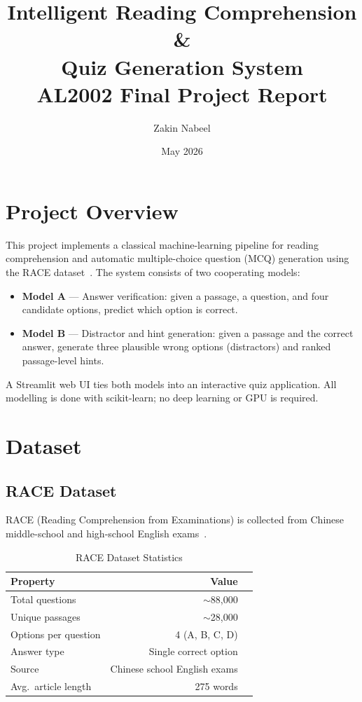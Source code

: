 \documentclass[12pt,a4paper]{article}
\title{
  \textbf{Intelligent Reading Comprehension \&\\Quiz Generation System}\\[0.5em]
  \large AL2002 Final Project Report
}
\author{Zakin Nabeel}
\date{May 2026}
\begin{document}
\maketitle
\tableofcontents
\newpage

\section{Project Overview}

This project implements a classical machine-learning pipeline for reading
comprehension and automatic multiple-choice question (MCQ) generation using
the RACE dataset~\cite{lai2017race}.
The system consists of two cooperating models:

\begin{itemize}
  \item \textbf{Model A} — Answer verification: given a passage, a question,
        and four candidate options, predict which option is correct.
  \item \textbf{Model B} — Distractor and hint generation: given a passage
        and the correct answer, generate three plausible wrong options
        (distractors) and ranked passage-level hints.
\end{itemize}

A Streamlit web UI ties both models into an interactive quiz application.
All modelling is done with scikit-learn; no deep learning or GPU is required.

\section{Dataset}

\subsection{RACE Dataset}

RACE (Reading Comprehension from Examinations) is collected from Chinese
middle-school and high-school English exams~\cite{lai2017race}.

\begin{table}[H]
\centering
\caption{RACE Dataset Statistics}
\begin{tabular}{lrr}
  \toprule
  \textbf{Property} & \textbf{Value} \\
  \midrule
  Total questions       & $\sim$88,000 \\
  Unique passages       & $\sim$28,000 \\
  Options per question  & 4 (A, B, C, D) \\
  Answer type           & Single correct option \\
  Source                & Chinese school English exams \\
  Avg.\ article length  & 275 words \\
  \bottomrule
\end{tabular}
\end{table}
\end{document}
